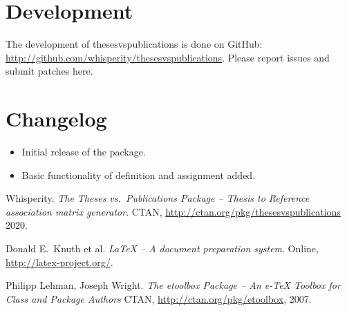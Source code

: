 \documentclass{article}
\begin{document}
\section{Development}
The development of \textsf{thesesvspublications} is done on GitHub: \\
    \url{http://github.com/whisperity/thesesvspublications}.
Please report issues and submit patches here.

\section{Changelog}\label{changelog}
\begin{itemize}
    \item Initial release of the package.
    \item Basic functionality of definition and assignment added.
\end{itemize}


\begin{thebibliography}{3}
Whisperity. \textit{The \textsf{Theses vs.\ Publications} Package -- Thesis to Reference association matrix generator}.
CTAN, \url{http://ctan.org/pkg/thesesvspublications} 2020.

Donald E.\ Knuth et al. 
\textit{\LaTeX{} -- A document preparation system}. 
Online, \url{http://latex-project.org/}.

Philipp Lehman, Joseph Wright.
\textit{The \textsf{etoolbox} Package -- An e-\TeX{} Toolbox for Class and Package Authors}
CTAN, \url{http://ctan.org/pkg/etoolbox}, 2007.
\end{thebibliography}
\end{document}
